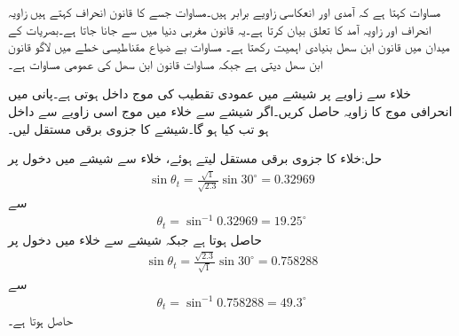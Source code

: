مساوات  کہتا ہے کہ آمدی اور انعکاسی زاویے برابر ہیں۔مساوات  جسے  کا قانون انحراف  کہتے ہیں زاویہ انحراف اور زاویہ آمد کا تعلق بیان کرتا ہے۔یہ قانون مغربی دنیا میں  سے جانا جاتا ہے۔بصریات کے میدان میں قانون ابن سھل بنیادی اہمیت رکھتا ہے۔ مساوات  بے ضیاع مقناطیسی خطے میں لاگو قانون ابن سھل دیتی ہے جبکہ مساوات  قانون ابن سھل کی عمومی مساوات ہے۔

خلاء سے  زاویے پر شیشے میں عمودی تقطیب کی موج داخل ہوتی ہے۔پانی میں انحرافی موج کا زاویہ  حاصل کریں۔اگر شیشے سے خلاء میں موج اسی زاویے سے داخل ہو تب  کیا ہو گا۔شیشے کا جزوی برقی مستقل  لیں۔

حل:خلاء کا جزوی برقی مستقل  لیتے ہوئے، خلاء سے شیشے میں دخول پر
\begin{align*}
\sin \theta_t = \frac{\sqrt{1}}{\sqrt{2.3}} \sin 30^\circ= 0.32969
\end{align*}
سے
\begin{align*}
\theta_t =\sin^{-1} 0.32969=19.25^\circ
\end{align*}
حاصل ہوتا ہے جبکہ شیشے سے خلاء میں دخول پر
\begin{align*}
\sin \theta_t = \frac{\sqrt{2.3}}{\sqrt{1}} \sin 30^\circ= 0.758288
\end{align*}
سے
\begin{align*}
\theta_t =\sin^{-1} 0.758288=49.3^\circ
\end{align*}
حاصل ہوتا ہے۔

